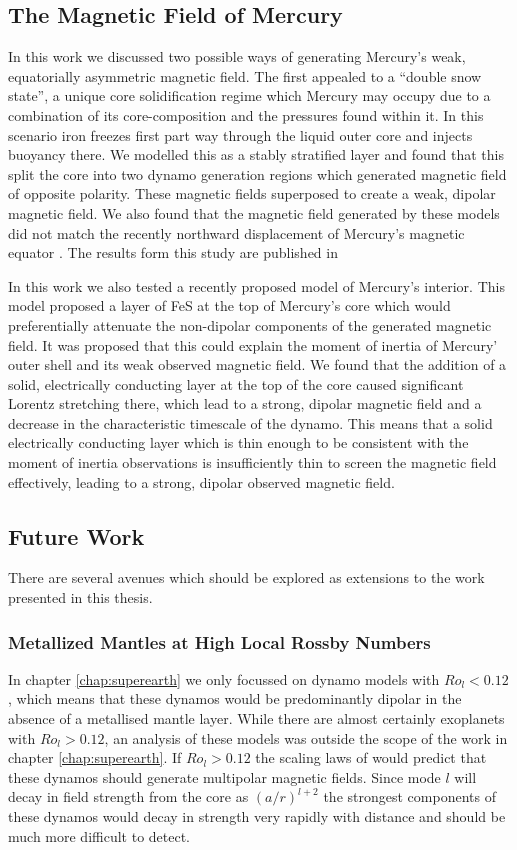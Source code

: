\subsection{The Magnetic Field of Mercury}
In this work we discussed two possible ways of generating Mercury's weak, equatorially asymmetric magnetic field. The first appealed to a ``double snow state'', a unique core solidification regime which Mercury may occupy due to a combination of its core-composition and the pressures found within it. In this scenario iron freezes first part way through the liquid outer core and injects buoyancy there. We modelled this as a stably stratified layer and found that this split the core into two dynamo generation regions which generated magnetic field of opposite polarity. These magnetic fields superposed to create a weak, dipolar magnetic field. We also found that the magnetic field generated by these models did not match the recently northward displacement of Mercury's magnetic equator \citep{smith2012}. The results form this study are published in \citet{vilim2010}

In this work we also tested a recently proposed model of Mercury's interior. This model proposed a layer of FeS at the top of Mercury's core which would preferentially attenuate the non-dipolar components of the generated magnetic field. It was proposed that this could explain the moment of inertia of Mercury' outer shell and its weak observed magnetic field. We found that the addition of a solid, electrically conducting layer at the top of the core caused significant Lorentz stretching there, which lead to a strong, dipolar magnetic field and a decrease in the characteristic timescale of the dynamo. This means that a solid electrically conducting layer which is thin enough to be consistent with the moment of inertia observations is insufficiently thin to screen the magnetic field effectively, leading to a strong, dipolar observed magnetic field.


\subsection{Future Work}
There are several avenues which should be explored as extensions to the work presented in this thesis.

\subsubsection{Metallized Mantles at High Local Rossby Numbers}
In chapter \ref{chap:superearth} we only focussed on dynamo models with $Ro_l<0.12$, which means that these dynamos would be predominantly dipolar in the absence of a metallised mantle layer. While there are almost certainly exoplanets with $Ro_l>0.12$, an analysis of these models was outside the scope of the work in chapter \ref{chap:superearth}. If $Ro_l>0.12$ the scaling laws of \citet{christensen06scaling} would predict that these dynamos should generate multipolar magnetic fields. Since mode $l$ will decay in field strength from the core as $\left(a/r\right)^{l+2}$ the strongest components of these dynamos would decay in strength very rapidly with distance and should be much more difficult to detect. 

